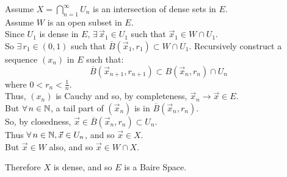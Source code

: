 \documentclass[letterpaper,12pt,fleqn]{article}
\newcommand{\vx}{\vec{x}}
\newcommand{\cl}[1]{\overline{#1}}
\begin{document}
\begin{theproof}
  Assume $X=\bigcap_{n=1}^{\infty}U_n$ is an intersection of dense sets in
  $E$. \\
  Assume $W$ is an open subset in $E$. \\
  Since $U_1$ is dense in $E$, $\exists\,\vx_1\in U_1$ such that
  $\vx_1\in W\cap U_1$. \\
  So $\exists\,r_1\in(0,1)$ such that $\cl{B}(\vx_1,r_1)\subset W\cap U_1$.
  Recursively construct a sequence $(x_n)$ in $E$ such that:
  \[\cl{B}(\vx_{n+1},r_{n+1})\subset B(\vx_n,r_n)\cap U_n\]
  where $0<r_n<\frac{1}{n}$. \\
  Thus, $(x_n)$ is Cauchy and so, by completeness, $\vx_n\to\vx\in E$. \\
  But $\forall\,n\in\mathbb{N}$, a tail part of $(\vx_n)$ is in $\cl{B}(\vx_n,r_n)$. \\
  So, by closedness, $\vx\in\cl{B}(\vx_n,r_n)\subset U_n$. \\
  Thus $\forall\,n\in\N,\vx\in U_n$, and so $\vx\in X$. \\
  But $\vx\in W$ also, and so $\vx\in W\cap X$.

  Therefore $X$ is dense, and so $E$ is a Baire Space.
\end{theproof}
\end{document}
